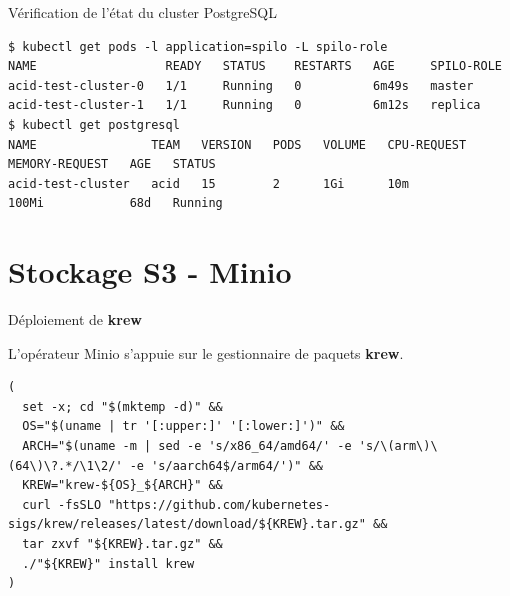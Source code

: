 
\begin{frame}[fragile]{Vérification de l'état du cluster PostgreSQL}

\begin{tiny}
\begin{Verbatim}[commandchars=\&\{\}]
$ kubectl get pods -l application=spilo -L spilo-role
NAME                  READY   STATUS    RESTARTS   AGE     SPILO-ROLE
acid-test-cluster-0   1/1     Running   0          6m49s   master
acid-test-cluster-1   1/1     Running   0          6m12s   replica
$ kubectl get postgresql
NAME                TEAM   VERSION   PODS   VOLUME   CPU-REQUEST   MEMORY-REQUEST   AGE   STATUS
acid-test-cluster   acid   15        2      1Gi      10m           100Mi            68d   Running
\end{Verbatim}
\end{tiny}

\end{frame}


\section{Stockage S3 - Minio}


\begin{frame}[fragile]{Déploiement de \textbf{krew}}

   L'opérateur Minio s'appuie sur le gestionnaire de paquets \textbf{krew}.\\
\begin{tiny}
\begin{Verbatim}[commandchars=\&\#\#]
(
  set -x; cd "$(mktemp -d)" &&
  OS="$(uname | tr '[:upper:]' '[:lower:]')" &&
  ARCH="$(uname -m | sed -e 's/x86_64/amd64/' -e 's/\(arm\)\(64\)\?.*/\1\2/' -e 's/aarch64$/arm64/')" &&
  KREW="krew-${OS}_${ARCH}" &&
  curl -fsSLO "https://github.com/kubernetes-sigs/krew/releases/latest/download/${KREW}.tar.gz" &&
  tar zxvf "${KREW}.tar.gz" &&
  ./"${KREW}" install krew
)
\end{Verbatim}
\end{tiny}

\end{frame}


